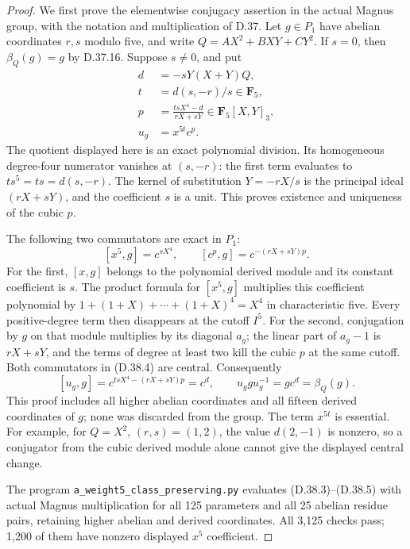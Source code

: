 \begin{proof}
We first prove the elementwise conjugacy assertion in the actual
Magnus group, with the notation and multiplication of D.37.
Let \(g\in P_1\) have abelian coordinates \(r,s\) modulo five,
and write \(Q=AX^2+BXY+CY^2\).
If \(s=0\), then \(\beta_Q(g)=g\) by D.37.16.
Suppose \(s\ne0\), and put
\[
 \begin{split}
 d&=-sY(X+Y)Q,\\
 t&=d(s,-r)/s\in\mathbf F_5,\\
 p&=\frac{tsX^4-d}{rX+sY}\in\mathbf F_5[X,Y]_3,\\
 u_g&=x^{5t}c^p.
 \end{split}
 \tag{D.38.3}
\]
The quotient displayed here is an exact polynomial division.
Its homogeneous degree-four numerator vanishes at \((s,-r)\):
the first term evaluates to \(ts^5=ts=d(s,-r)\).
The kernel of substitution \(Y=-rX/s\) is the principal ideal
\((rX+sY)\), and the coefficient \(s\) is a unit.  This proves
existence and uniqueness of the cubic \(p\).

The following two commutators are exact in \(P_1\):
\[
 [x^5,g]=c^{sX^4},\qquad
 [c^p,g]=c^{-(rX+sY)p}.
 \tag{D.38.4}
\]
For the first, \([x,g]\) belongs to the polynomial derived module
and its constant coefficient is \(s\).  The product formula for
\([x^5,g]\) multiplies this coefficient polynomial by
\(1+(1+X)+\cdots+(1+X)^4=X^4\) in characteristic five.
Every positive-degree term then disappears at the cutoff \(I^5\).
For the second, conjugation by \(g\) on that module multiplies
by its diagonal \(a_g\); the linear part of \(a_g-1\) is
\(rX+sY\), and the terms of degree at least two kill the cubic
\(p\) at the same cutoff.  Both commutators in
\textup{(D.38.4)} are central.  Consequently
\[
 [u_g,g]=c^{tsX^4-(rX+sY)p}=c^d,
 \qquad u_ggu_g^{-1}=g c^d=\beta_Q(g).
 \tag{D.38.5}
\]
This proof includes all higher abelian coordinates and all fifteen
derived coordinates of \(g\); none was discarded from the group.
The term \(x^{5t}\) is essential.  For example, for
\(Q=X^2\), \((r,s)=(1,2)\), the value \(d(2,-1)\) is nonzero,
so a conjugator from the cubic derived module alone cannot give
the displayed central change.

The program \texttt{a\_weight5\_class\_preserving.py} evaluates
\textup{(D.38.3)--(D.38.5)} with actual Magnus multiplication
for all 125 parameters and all 25 abelian residue pairs, retaining
higher abelian and derived coordinates.  All 3,125 checks pass;
1,200 of them have nonzero displayed \(x^5\) coefficient.


\end{proof}
